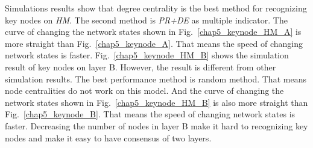 Simulations results show that degree centrality is the best method for recognizing key nodes on \textit{HM}. The second method is \textit{PR+DE} as multiple indicator. The curve of changing the network states shown in Fig.~\ref{chap5_keynode_HM_A} is more straight than Fig.~\ref{chap5_keynode_A}. That means the speed of changing network states is faster. 
Fig.~\ref{chap5_keynode_HM_B} shows the simulation result of key nodes on layer B. However, the result is different from other simulation results. The best performance method is random method. That means node centralities do not work on this model. And the curve of changing the network states shown in Fig.~\ref{chap5_keynode_HM_B} is also more straight than Fig.~\ref{chap5_keynode_B}. That means the speed of changing network states is faster. Decreasing the number of nodes in layer B make it hard to recognizing key nodes and make it easy to have consensus of two layers. 

